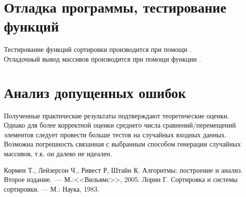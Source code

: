 \documentclass[a4paper,12pt,titlepage,finall]{article}
\begin{document}
\section{Отладка программы, тестирование функций}

Тестирование функций сортировки производится при помощи  \rmfamily.\\
Отладочный вывод массивов производится при помощи функции  \rmfamily.

\newpage

\section{Анализ допущенных ошибок}
Полученные практические результаты подтверждают теоретические оценки.\\
Однако для более корректной оценки среднего числа сравнений/перемещений элементов следует провести больше тестов на случайных входных данных.\\
Возможна погрешность связанная с выбранным способом генерации случайных массивов, т.к. он далеко не идеален.


\newpage
\begin{raggedright}
\begin{thebibliography}{99}
 Кормен Т., Лейзерсон Ч., Ривест Р, Штайн К. Алгоритмы: построение и анализ.
    Второе издание.~--- М.:<<Вильямс>>, 2005.
 Лорин Г. Сортировка и системы сортировки. — М.: Наука, 1983.
\end{thebibliography}
\end{raggedright}
\end{document}
